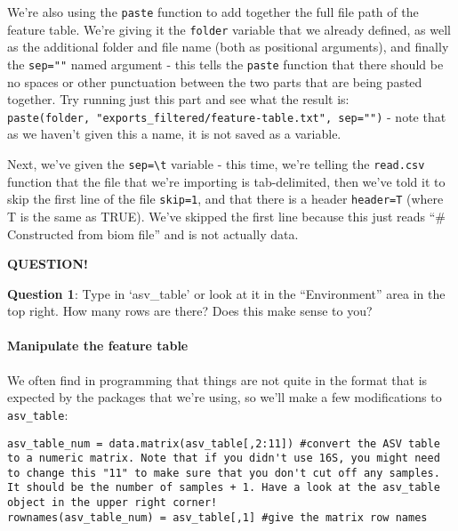 \documentclass[
]{book}
\newenvironment{bluebox}{
  \definecolor{shadecolor}{RGB}{172, 210, 237}
  \color{white}
  \begin{shaded}}
 {\end{shaded}}
\begin{document}
We're also using the \texttt{paste} function to add together the full file path of the feature table. We're giving it the \texttt{folder} variable that we already defined, as well as the additional folder and file name (both as positional arguments), and finally the \texttt{sep=""} named argument - this tells the \texttt{paste} function that there should be no spaces or other punctuation between the two parts that are being pasted together. Try running just this part and see what the result is: \texttt{paste(folder,\ "exports\_filtered/feature-table.txt",\ sep="")} - note that as we haven't given this a name, it is not saved as a variable.

Next, we've given the \texttt{sep=\textquotesingle{}\textbackslash{}t\textquotesingle{}} variable - this time, we're telling the \texttt{read.csv} function that the file that we're importing is tab-delimited, then we've told it to skip the first line of the file \texttt{skip=1}, and that there is a header \texttt{header=T} (where T is the same as TRUE). We've skipped the first line because this just reads ``\# Constructed from biom file'' and is not actually data.

\begin{bluebox}

\begin{center}
\textbf{QUESTION!}

\end{center}

\textbf{Question 1}: Type in `asv\_table' or look at it in the ``Environment'' area in the top right. How many rows are there? Does this make sense to you?

\end{bluebox}

\paragraph{Manipulate the feature table}\label{manipulate-the-feature-table}

We often find in programming that things are not quite in the format that is expected by the packages that we're using, so we'll make a few modifications to \texttt{asv\_table}:

\begin{verbatim}
asv_table_num = data.matrix(asv_table[,2:11]) #convert the ASV table to a numeric matrix. Note that if you didn't use 16S, you might need to change this "11" to make sure that you don't cut off any samples. It should be the number of samples + 1. Have a look at the asv_table object in the upper right corner!
rownames(asv_table_num) = asv_table[,1] #give the matrix row names
\end{verbatim}
\end{document}
